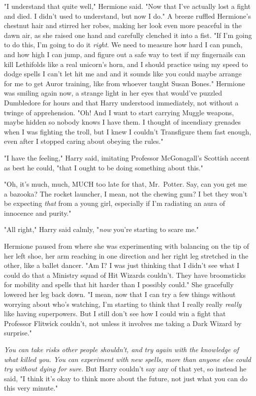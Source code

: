 "I understand that quite well," Hermione said. "Now that I've actually lost a
fight and died. I didn't used to understand, but now I do." A breeze ruffled
Hermione's chestnut hair and stirred her robes, making her look even more
peaceful in the dawn air, as she raised one hand and carefully clenched it into
a fist. "If I'm going to do this, I'm going to do it \emph{right}. We need to
measure how hard I can punch, and how high I can jump, and figure out a safe
way to test if my fingernails can kill Lethifolds like a real unicorn's horn,
and I should practice using my speed to dodge spells I can't let hit me
and{\el} and it sounds like you could maybe arrange for me to get Auror
training, like from whoever taught Susan Bones." Hermione was smiling again
now, a strange light in her eyes that would've puzzled Dumbledore for hours and
that Harry understood immediately, not without a twinge of apprehension. "Oh!
And I want to start carrying Muggle weapons, maybe hidden so nobody knows I
have them. I thought of incendiary grenades when I was fighting the troll, but
I knew I couldn't Transfigure them fast enough, even after I stopped caring
about obeying the rules."

"I have the feeling," Harry said, imitating Professor McGonagall's Scottish
accent as best he could, "that I ought to be doing something about this."

"Oh, it's much, much, MUCH too late for that, Mr.~Potter. Say, can you get me a
bazooka? The rocket launcher, I mean, not the chewing gum? I bet they won't be
expecting \emph{that} from a young girl, especially if I'm radiating an aura of
innocence and purity."

"All right," Harry said calmly, "\emph{now} you're starting to scare me."

Hermione paused from where she was experimenting with balancing on the tip of
her left shoe, her arm reaching in one direction and her right leg stretched in
the other, like a ballet dancer. "Am I? I was just thinking that I didn't see
what I could do that a Ministry squad of Hit Wizards couldn't. They have
broomsticks for mobility and spells that hit harder than I possibly could." She
gracefully lowered her leg back down. "I mean, now that I can try a few things
without worrying about who's watching, I'm starting to think that I really
really \emph{really} like having superpowers. But I still don't see how I could
win a fight that Professor Flitwick couldn't, not unless it involves me taking
a Dark Wizard by surprise."

\emph{You can take risks other people shouldn't, and try again with the
knowledge of what killed you. You can experiment with new spells, more than
anyone else could try without dying for sure.} But Harry couldn't say any of
that yet, so instead he said, "I think it's okay to think more about the
future, not just what you can do this very minute."

